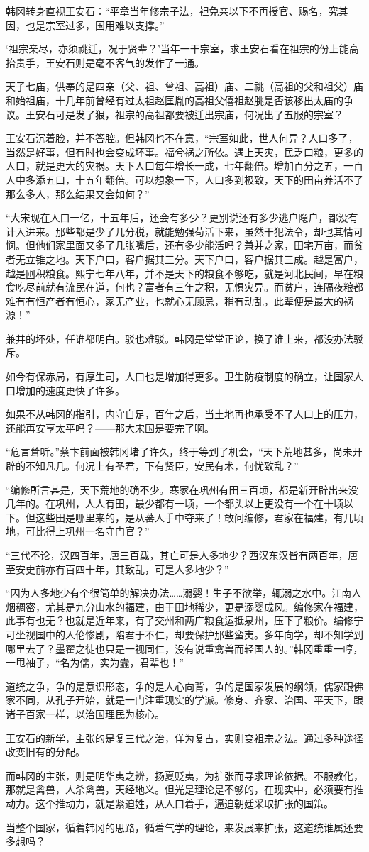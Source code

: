 韩冈转身直视王安石：“平章当年修宗子法，袒免亲以下不再授官、赐名，究其因，也是宗室过多，国用难以支撑。”

‘祖宗亲尽，亦须祧迁，况于贤辈？’当年一干宗室，求王安石看在祖宗的份上能高抬贵手，王安石则是毫不客气的发作了一通。

天子七庙，供奉的是四亲（父、祖、曾祖、高祖）庙、二祧（高祖的父和祖父）庙和始祖庙，十几年前曾经有过太祖赵匡胤的高祖父僖祖赵朓是否该移出太庙的争议。王安石可是发了狠，祖宗的高祖都要被迁出宗庙，何况出了五服的宗室？

王安石沉着脸，并不答腔。但韩冈也不在意，“宗室如此，世人何异？人口多了，当然是好事，但有时也会变成坏事。福兮祸之所依。遇上天灾，民乏口粮，更多的人口，就是更大的灾祸。天下人口每年增长一成，七年翻倍。增加百分之五，一百人中多添五口，十五年翻倍。可以想象一下，人口多到极致，天下的田亩养活不了那么多人，那么结果又会如何？”

“大宋现在人口一亿，十五年后，还会有多少？更别说还有多少逃户隐户，都没有计入进来。那些都是少了几分税，就能勉强苟活下来，虽然干犯法令，却也其情可悯。但他们家里面又多了几张嘴后，还有多少能活吗？兼并之家，田宅万亩，而贫者无立锥之地。天下户口，客户据其三分。天下户口，客户据其三成。越是富户，越是囤积粮食。熙宁七年八年，并不是天下的粮食不够吃，就是河北民间，早在粮食吃尽前就有流民在道，何也？富者有三年之积，无惧灾异。而贫户，连隔夜粮都难有有恒产者有恒心，家无产业，也就心无顾忌，稍有动乱，此辈便是最大的祸源！”

兼并的坏处，任谁都明白。驳也难驳。韩冈是堂堂正论，换了谁上来，都没办法驳斥。

如今有保赤局，有厚生司，人口也是增加得更多。卫生防疫制度的确立，让国家人口增加的速度更快了许多。

如果不从韩冈的指引，内守自足，百年之后，当土地再也承受不了人口上的压力，还能再安享太平吗？——那大宋国是要完了啊。

“危言耸听。”蔡卞前面被韩冈堵了许久，终于等到了机会，“天下荒地甚多，尚未开辟的不知凡几。何况上有圣君，下有贤臣，安民有术，何忧致乱？”

“编修所言甚是，天下荒地的确不少。寒家在巩州有田三百顷，都是新开辟出来没几年的。在巩州，人人有田，最少都有一顷，一个都头以上更没有一个在十顷以下。但这些田是哪里来的，是从蕃人手中夺来了！敢问编修，君家在福建，有几顷地，可比得上巩州一名守门官？”

“三代不论，汉四百年，唐三百载，其亡可是人多地少？西汉东汉皆有两百年，唐至安史前亦有百四十年，其致乱，可是人多地少？”

“因为人多地少有个很简单的解决办法……溺婴！生子不欲举，辄溺之水中。江南人烟稠密，尤其是九分山水的福建，由于田地稀少，更是溺婴成风。编修家在福建，此事有也无？也就是近年来，有了交州和两广粮食运抵泉州，压下了粮价。编修宁可坐视国中的人伦惨剧，陷君于不仁，却要保护那些蛮夷。多年向学，却不知学到哪里去了？墨翟之徒也只是一视同仁，没有说重禽兽而轻国人的。”韩冈重重一哼，一甩袖子，“名为儒，实为蠹，君辈也！”

道统之争，争的是意识形态，争的是人心向背，争的是国家发展的纲领，儒家跟佛家不同，从孔子开始，就是一门注重现实的学派。修身、齐家、治国、平天下，跟诸子百家一样，以治国理民为核心。

王安石的新学，主张的是复三代之治，佯为复古，实则变祖宗之法。通过多种途径改变旧有的分配。

而韩冈的主张，则是明华夷之辨，扬夏贬夷，为扩张而寻求理论依据。不服教化，那就是禽兽，人杀禽兽，天经地义。但光是理论是不够的，在现实中，必须要有推动力。这个推动力，就是紧迫姓，从人口着手，逼迫朝廷采取扩张的国策。

当整个国家，循着韩冈的思路，循着气学的理论，来发展来扩张，这道统谁属还要多想吗？

